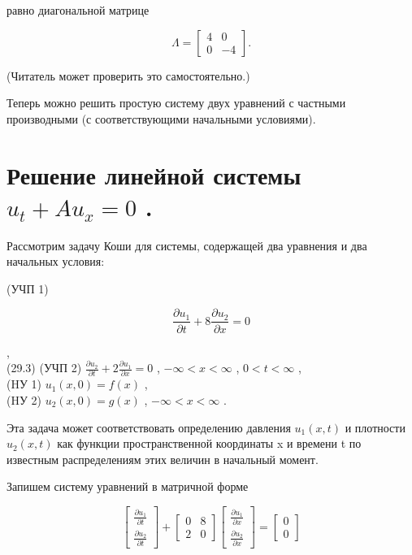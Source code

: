 \documentclass[
  ukrainian,
]{article}
\begin{document}
равно диагональной матрице

\[
\Lambda = \begin{bmatrix} 4 & 0 \\ 0 & -4 \end{bmatrix}.
\]

(Читатель может проверить это самостоятельно.)

Теперь можно решить простую систему двух уравнений с частными
производными (с соответствующими начальными условиями).

\section{\texorpdfstring{Решение линейной системы \(u_t + Au_x = 0\)
.}{Решение линейной системы u\_t + Au\_x = 0 .}}\label{ux440ux435ux448ux435ux43dux438ux435-ux43bux438ux43dux435ux439ux43dux43eux439-ux441ux438ux441ux442ux435ux43cux44b-u_t-au_x-0-.}

Рассмотрим задачу Коши для системы, содержащей два уравнения и два
начальных условия:

(УЧП 1)

\[
\frac{\partial u_1}{\partial t} + 8 \frac{\partial u_2}{\partial x} = 0
\]

,\\
(29.3) (УЧП 2)
\(\frac{\partial u_2}{\partial t} + 2 \frac{\partial u_1}{\partial x} = 0\)
, \(-\infty < x < \infty\) , \(0 < t < \infty\) ,\\
(HУ 1) \(u_1(x, 0) = f(x)\) ,\\
(HУ 2) \(u_2(x, 0) = g(x)\) , \(-\infty < x < \infty\) .

Эта задача может соответствовать определению давления \(u_1(x, t)\) и
плотности \(u_2(x, t)\) как функции пространственной координаты x и
времени t по известным распределениям этих величин в начальный момент.

Запишем систему уравнений в матричной форме

\[
\begin{bmatrix} \frac{\partial u_1}{\partial t} \\ \frac{\partial u_2}{\partial t} \end{bmatrix} + \begin{bmatrix} 0 & 8 \\ 2 & 0 \end{bmatrix} \begin{bmatrix} \frac{\partial u_1}{\partial x} \\ \frac{\partial u_2}{\partial x} \end{bmatrix} = \begin{bmatrix} 0 \\ 0 \end{bmatrix}
\]
\end{document}
